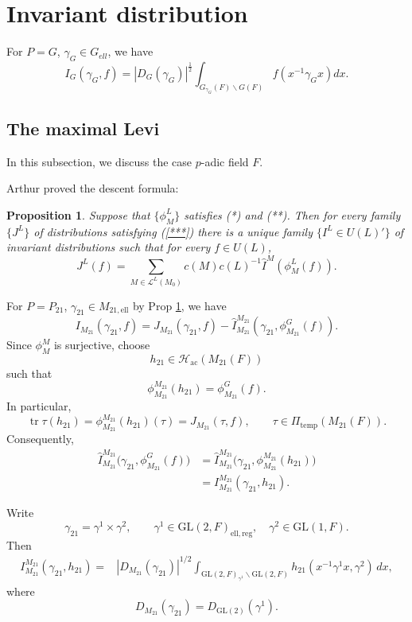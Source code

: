 \documentclass[11pt]{amsart}
\newtheorem {proposition}[theorem]    {Proposition}
\renewcommand{\rm}{\mathrm}
\theoremstyle{definition}
\numberwithin{equation}{section}
\begin{document}
	
	
	
	
	
	
	
	
	
	
	
	
	
	
	
	
	
	
	
	
	
	\section{Invariant distribution}
	For $P=G$, $\gamma_G\in G_{ell}$, we have \[I_G(\gamma_G,f)=|D_G(\gamma_G)|^{\frac{1}{2}}\int_{G_{\gamma_G}(F)\backslash G(F)}f(x^{-1}\gamma_G x)dx.\]
	\subsection{The maximal Levi}
    In this subsection, we discuss the case \(p\)-adic field \(F\).
    
	Arthur proved the descent formula:
	\begin{proposition}\label{descent}\cite{Art81}
		Suppose that \( \{ \phi_M^L \} \) satisfies (*) and (**). Then for every family \( \{ J^L \} \) of distributions satisfying (\ref{***}) there is a unique family \( \{ I^L \in U(L)' \} \) of invariant distributions such that for every \( f \in U(L) \),
		\[
		J^L(f) = \sum_{M \in \mathcal{L}^L(M_0)} c(M) c(L)^{-1} \hat{I}^M(\phi_M^L(f)).
		\]
	\end{proposition}
	For \(P=P_{21}\), \(\gamma_{21}\in M_{21,\rm{ell}}\) by Prop \ref{descent}, we have
	\[I_{M_{21}}(\gamma_{21},f)=J_{M_{21}}(\gamma_{21},f)-\hat{I}_{M_{21}}^{M_{21}}(\gamma_{21},\phi_{M_{21}}^G(f)).\]
	Since \(\phi^M_M\) is surjective, choose
\[
h_{21}\in\mathcal {H}_{\rm{ac}}(M_{21}(F))
\]
such that
\[
\phi_{M_{21}}^{M_{21}}(h_{21})
=
\phi_{M_{21}}^G(f).
\]
In particular,
\[
\operatorname{tr}\tau(h_{21})
=
\phi_{M_{21}}^{M_{21}}(h_{21})(\tau)
=
J_{M_{21}}(\tau,f),
\qquad
\tau\in\Pi_{\mathrm{temp}}(M_{21}(F)).
\]
Consequently,
\[
\begin{aligned}
\widehat I_{M_{21}}^{M_{21}}
\bigl(\gamma_{21},\phi_{M_{21}}^G(f)\bigr)
&=
\widehat I_{M_{21}}^{M_{21}}
\bigl(\gamma_{21},
      \phi_{M_{21}}^{M_{21}}(h_{21})\bigr)\\
&=
I_{M_{21}}^{M_{21}}(\gamma_{21},h_{21}).
\end{aligned}
\]

Write
\[
\gamma_{21}=\gamma^1\times\gamma^2,
\qquad
\gamma^1\in\mathrm{GL}(2,F)_{\mathrm{ell,reg}},
\quad
\gamma^2\in\mathrm{GL}(1,F).
\]
Then
\[
\begin{aligned}
I_{M_{21}}^{M_{21}}(\gamma_{21},h_{21})
=&|D_{M_{21}}(\gamma_{21})|^{1/2}
\int_{\mathrm{GL}(2,F)_{\gamma^1}\backslash\mathrm{GL}(2,F)}
h_{21}(x^{-1}\gamma^1x,\gamma^2)\,dx,
\end{aligned}
\]
where
\[
D_{M_{21}}(\gamma_{21})
=
D_{\mathrm{GL}(2)}(\gamma^1).
\]
\end{document}
